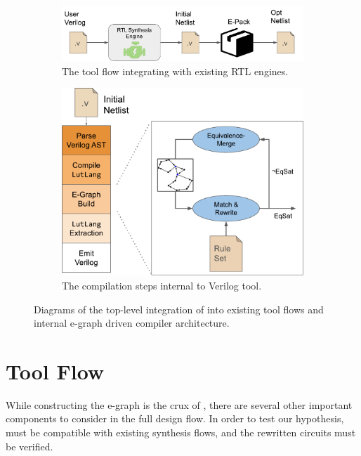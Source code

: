\begin{figure}
    \begin{subfigure}{0.47\textwidth}
        \centering
        \includegraphics[width=\textwidth]{img/flow.pdf}
        \caption{The tool flow integrating \shortname{} with existing RTL engines.}\label{fig:flow:rtl}
    \end{subfigure}
    \hfill\vspace{4mm}
    \begin{subfigure}{0.47\textwidth}
        \centering
        \includegraphics[width=\textwidth]{img/egraph.pdf}
        \caption{The compilation steps internal to \shortname{} Verilog tool.}\label{fig:flow:egraph}
    \end{subfigure}
    \caption{Diagrams of the top-level integration of \shortname{} into existing tool flows and internal e-graph driven compiler architecture.}\label{fig:flow}
\end{figure}

\section{Tool Flow}\label{sec:flow}

While constructing the e-graph is the crux of \shortname{}, there are several
other important components to consider in the full design flow. In order to
test our hypothesis, \shortname{} must be compatible with existing synthesis
flows, and the rewritten circuits must be verified.

